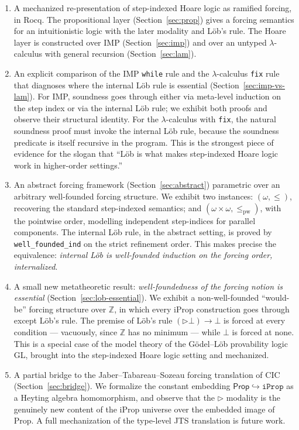 \documentclass[11pt]{article}
\begin{document}
\begin{enumerate}

\item A mechanized re-presentation of step-indexed Hoare logic
as ramified forcing, in Rocq.
The propositional layer (Section~\ref{sec:prop}) gives a forcing
semantics for an intuitionistic logic with the later modality and
Löb's rule. The Hoare layer is constructed over IMP
(Section~\ref{sec:imp}) and over an untyped $\lambda$-calculus with
general recursion (Section~\ref{sec:lam}).

\item An explicit comparison of the IMP \texttt{while} rule and the
$\lambda$-calculus \texttt{fix} rule that diagnoses where the
internal Löb rule is essential
(Section~\ref{sec:imp-vs-lam}). For IMP, soundness goes through
either via meta-level induction on the step index or via the
internal Löb rule; we exhibit both proofs and observe their
structural identity. For the $\lambda$-calculus with \texttt{fix},
the natural soundness proof must invoke the internal Löb rule,
because the soundness predicate is itself recursive in the
program. This is the strongest piece of evidence for the slogan that
``Löb is what makes step-indexed Hoare logic work in higher-order
settings.''

\item An abstract forcing framework
(Section~\ref{sec:abstract}) parametric over an arbitrary
well-founded forcing structure. We exhibit two instances:
$(\omega, \le)$, recovering the standard step-indexed semantics; and
$(\omega \times \omega, \le_{\mathrm{pw}})$, with the pointwise
order, modelling independent step-indices for parallel components.
The internal Löb rule, in the abstract setting, is proved by
\texttt{well\_founded\_ind} on the strict refinement order. This
makes precise the equivalence: \emph{internal Löb is well-founded
induction on the forcing order, internalized}.

\item A small new metatheoretic result: \emph{well-foundedness of
the forcing notion is essential}
(Section~\ref{sec:lob-essential}). We exhibit a non-well-founded
``would-be'' forcing structure over $\mathbb{Z}$, in which every
iProp construction goes through except Löb's rule. The premise of
Löb's rule $(\triangleright \bot) \to \bot$ is forced at every
condition --- vacuously, since $\mathbb{Z}$ has no minimum --- while
$\bot$ is forced at none. This is a special case of the model theory
of the Gödel--Löb provability logic \textsf{GL}, brought into the
step-indexed Hoare logic setting and mechanized.

\item A partial bridge to the Jaber--Tabareau--Sozeau forcing
translation of CIC (Section~\ref{sec:bridge}). We formalize the
constant embedding $\mathsf{Prop} \hookrightarrow \mathtt{iProp}$
as a Heyting algebra homomorphism, and observe that the $\triangleright$
modality is the genuinely new content of the iProp universe over
the embedded image of Prop. A full mechanization of the type-level
JTS translation is future work.

\end{enumerate}
\end{document}
